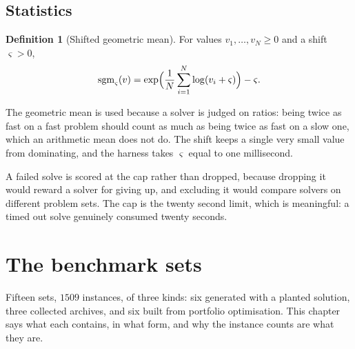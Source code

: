 \documentclass[a4paper,11pt]{book}
\theoremstyle{plain}
\theoremstyle{definition}
\newtheorem{definition}[theorem]{Definition}
\theoremstyle{remark}
\numberwithin{equation}{chapter}
\numberwithin{algorithm}{chapter}
\begin{document}
	\section{Statistics}

	\begin{definition}[Shifted geometric mean]\label{def:sgm}
		For values $v_1,\dots,v_N\geq0$ and a shift $\varsigma>0$,
		\begin{equation}
			\mathrm{sgm}_{\varsigma}(v)
			=\exp\Bigl(\frac1N\sum_{i=1}^{N}\log(v_i+\varsigma)\Bigr)-\varsigma .
		\end{equation}
	\end{definition}

	The geometric mean is used because a solver is judged on ratios: being twice
	as fast on a fast problem should count as much as being twice as fast on a
	slow one, which an arithmetic mean does not do. The shift keeps a single very
	small value from dominating, and the harness takes $\varsigma$ equal to one
	millisecond.

	A failed solve is scored at the cap rather than dropped, because dropping it
	would reward a solver for giving up, and excluding it would compare solvers on
	different problem sets. The cap is the twenty second limit, which is
	meaningful: a timed out solve genuinely consumed twenty seconds.



	\chapter{The benchmark sets}

	Fifteen sets, $1509$ instances, of three kinds: six generated with a planted
	solution, three collected archives, and six built from portfolio
	optimisation. This chapter says what each contains, in what form, and why
	the instance counts are what they are.
\end{document}
